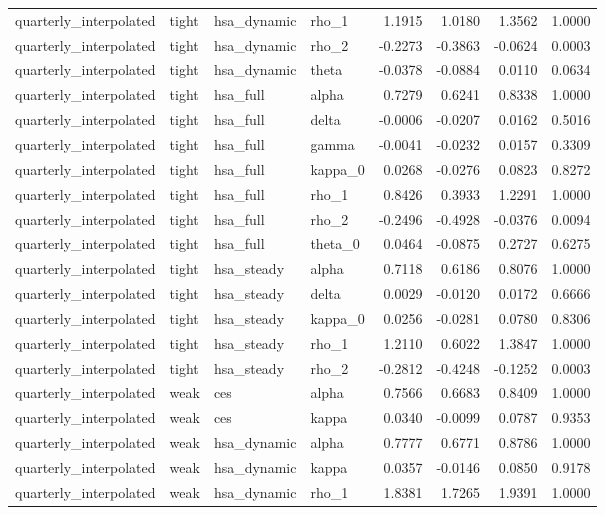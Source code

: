 \begin{tabular}{llllrrrr}
quarterly\_interpolated & tight & hsa\_dynamic & rho\_1 & 1.1915 & 1.0180 & 1.3562 & 1.0000 \\
quarterly\_interpolated & tight & hsa\_dynamic & rho\_2 & -0.2273 & -0.3863 & -0.0624 & 0.0003 \\
quarterly\_interpolated & tight & hsa\_dynamic & theta & -0.0378 & -0.0884 & 0.0110 & 0.0634 \\
quarterly\_interpolated & tight & hsa\_full & alpha & 0.7279 & 0.6241 & 0.8338 & 1.0000 \\
quarterly\_interpolated & tight & hsa\_full & delta & -0.0006 & -0.0207 & 0.0162 & 0.5016 \\
quarterly\_interpolated & tight & hsa\_full & gamma & -0.0041 & -0.0232 & 0.0157 & 0.3309 \\
quarterly\_interpolated & tight & hsa\_full & kappa\_0 & 0.0268 & -0.0276 & 0.0823 & 0.8272 \\
quarterly\_interpolated & tight & hsa\_full & rho\_1 & 0.8426 & 0.3933 & 1.2291 & 1.0000 \\
quarterly\_interpolated & tight & hsa\_full & rho\_2 & -0.2496 & -0.4928 & -0.0376 & 0.0094 \\
quarterly\_interpolated & tight & hsa\_full & theta\_0 & 0.0464 & -0.0875 & 0.2727 & 0.6275 \\
quarterly\_interpolated & tight & hsa\_steady & alpha & 0.7118 & 0.6186 & 0.8076 & 1.0000 \\
quarterly\_interpolated & tight & hsa\_steady & delta & 0.0029 & -0.0120 & 0.0172 & 0.6666 \\
quarterly\_interpolated & tight & hsa\_steady & kappa\_0 & 0.0256 & -0.0281 & 0.0780 & 0.8306 \\
quarterly\_interpolated & tight & hsa\_steady & rho\_1 & 1.2110 & 0.6022 & 1.3847 & 1.0000 \\
quarterly\_interpolated & tight & hsa\_steady & rho\_2 & -0.2812 & -0.4248 & -0.1252 & 0.0003 \\
quarterly\_interpolated & weak & ces & alpha & 0.7566 & 0.6683 & 0.8409 & 1.0000 \\
quarterly\_interpolated & weak & ces & kappa & 0.0340 & -0.0099 & 0.0787 & 0.9353 \\
quarterly\_interpolated & weak & hsa\_dynamic & alpha & 0.7777 & 0.6771 & 0.8786 & 1.0000 \\
quarterly\_interpolated & weak & hsa\_dynamic & kappa & 0.0357 & -0.0146 & 0.0850 & 0.9178 \\
quarterly\_interpolated & weak & hsa\_dynamic & rho\_1 & 1.8381 & 1.7265 & 1.9391 & 1.0000 \\

\end{tabular}
